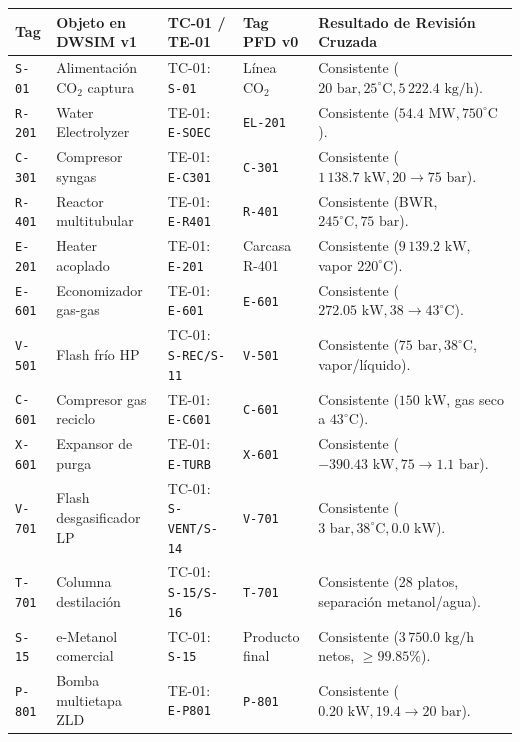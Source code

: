 \documentclass[11pt,letterpaper]{article}
\begin{document}
\vspace{0.2cm}
\begin{center}
\footnotesize
\begin{tabularx}{\textwidth}{lp{3.5cm}p{3.0cm}p{2.5cm}X}
\toprule
\textbf{Tag} & \textbf{Objeto en DWSIM v1} & \textbf{TC-01 / TE-01} & \textbf{Tag PFD v0} & \textbf{Resultado de Revisión Cruzada} \\
\midrule
\texttt{S-01} & Alimentación $\text{CO}_2$ captura & TC-01: \texttt{S-01} & Línea $\text{CO}_2$ & Consistente ($20\text{ bar}, 25^\circ\text{C}, 5\,222.4\text{ kg/h}$). \\
\texttt{R-201} & Water Electrolyzer & TE-01: \texttt{E-SOEC} & \texttt{EL-201} & Consistente ($54.4\text{ MW}, 750^\circ\text{C}$). \\
\texttt{C-301} & Compresor syngas & TE-01: \texttt{E-C301} & \texttt{C-301} & Consistente ($1\,138.7\text{ kW}, 20 \to 75\text{ bar}$). \\
\texttt{R-401} & Reactor multitubular & TE-01: \texttt{E-R401} & \texttt{R-401} & Consistente (BWR, $245^\circ\text{C}, 75\text{ bar}$). \\
\texttt{E-201} & Heater acoplado & TE-01: \texttt{E-201} & Carcasa R-401 & Consistente ($9\,139.2\text{ kW}$, vapor $220^\circ\text{C}$). \\
\texttt{E-601} & Economizador gas-gas & TE-01: \texttt{E-601} & \texttt{E-601} & Consistente ($272.05\text{ kW}, 38 \to 43^\circ\text{C}$). \\
\texttt{V-501} & Flash frío HP & TC-01: \texttt{S-REC/S-11}& \texttt{V-501} & Consistente ($75\text{ bar}, 38^\circ\text{C}$, vapor/líquido). \\
\texttt{C-601} & Compresor gas reciclo & TE-01: \texttt{E-C601} & \texttt{C-601} & Consistente ($150\text{ kW}$, gas seco a $43^\circ\text{C}$). \\
\texttt{X-601} & Expansor de purga & TE-01: \texttt{E-TURB} & \texttt{X-601} & Consistente ($-390.43\text{ kW}, 75 \to 1.1\text{ bar}$). \\
\texttt{V-701} & Flash desgasificador LP & TC-01: \texttt{S-VENT/S-14}& \texttt{V-701} & Consistente ($3\text{ bar}, 38^\circ\text{C}, 0.0\text{ kW}$). \\
\texttt{T-701} & Columna destilación & TC-01: \texttt{S-15/S-16} & \texttt{T-701} & Consistente (28 platos, separación metanol/agua). \\
\texttt{S-15} & e-Metanol comercial & TC-01: \texttt{S-15} & Producto final & Consistente ($3\,750.0\text{ kg/h}$ netos, $\ge 99.85\%$). \\
\texttt{P-801} & Bomba multietapa ZLD & TE-01: \texttt{E-P801} & \texttt{P-801} & Consistente ($0.20\text{ kW}, 19.4 \to 20\text{ bar}$). \\
\bottomrule
\end{tabularx}
\end{center}
\end{document}
